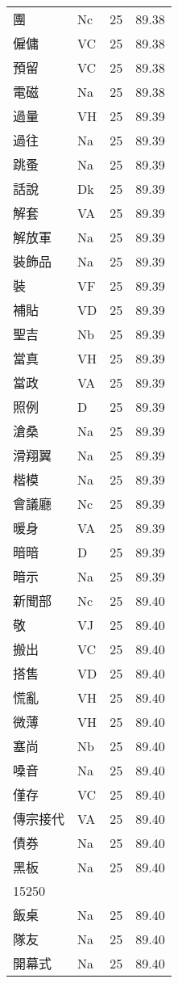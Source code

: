 \documentclass[twocolumn]{book}
\begin{document}
\begin{supertabular}{llrr}
團 & Nc & 25 &  89.38\\
僱傭 & VC & 25 &  89.38\\
預留 & VC & 25 &  89.38\\
電磁 & Na & 25 &  89.38\\
過量 & VH & 25 &  89.39\\
過往 & Na & 25 &  89.39\\
跳蚤 & Na & 25 &  89.39\\
話說 & Dk & 25 &  89.39\\
解套 & VA & 25 &  89.39\\
解放軍 & Na & 25 &  89.39\\
裝飾品 & Na & 25 &  89.39\\
裝 & VF & 25 &  89.39\\
補貼 & VD & 25 &  89.39\\
聖吉 & Nb & 25 &  89.39\\
當真 & VH & 25 &  89.39\\
當政 & VA & 25 &  89.39\\
照例 & D & 25 &  89.39\\
滄桑 & Na & 25 &  89.39\\
滑翔翼 & Na & 25 &  89.39\\
楷模 & Na & 25 &  89.39\\
會議廳 & Nc & 25 &  89.39\\
暖身 & VA & 25 &  89.39\\
暗暗 & D & 25 &  89.39\\
暗示 & Na & 25 &  89.39\\
新聞部 & Nc & 25 &  89.40\\
敬 & VJ & 25 &  89.40\\
搬出 & VC & 25 &  89.40\\
搭售 & VD & 25 &  89.40\\
慌亂 & VH & 25 &  89.40\\
微薄 & VH & 25 &  89.40\\
塞尚 & Nb & 25 &  89.40\\
嗓音 & Na & 25 &  89.40\\
僅存 & VC & 25 &  89.40\\
傳宗接代 & VA & 25 &  89.40\\
債券 & Na & 25 &  89.40\\
黑板 & Na & 25 &  89.40\\
15250\\
飯桌 & Na & 25 &  89.40\\
隊友 & Na & 25 &  89.40\\
開幕式 & Na & 25 &  89.40\\

\end{supertabular}
\end{document}
